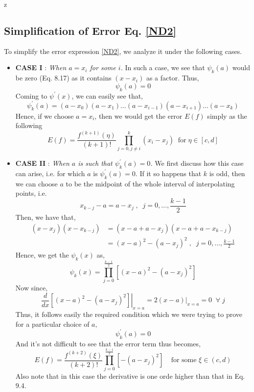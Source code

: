 z\documentclass[a4paper,12pt,twoside]{book}
\newcommand{\nll}[0]{\newline\newline}
\newcommand{\tit}[1]{\textit{#1}}
\newcommand{\der}[2]{\frac{d #1}{d #2}}
\begin{document}
\subsection{Simplification of Error Eq. \ref{ND2}}
To simplify the error expression \ref{ND2}, we analyze it under the following cases.
\begin{itemize}
    \item {\textbf{CASE I} : \tit{When $a=x_i$ for some $i$.}
    \nll
    In such a case, we see that $\psi_k(a)$ would be zero (Eq. 8.17) as it contains $(x-x_i)$ as a factor. Thus,
    \[\psi_k(a) = 0\]
    Coming to $\psi^\prime(x)$, we can easily see that,
    \[\psi_k^\prime(a) = (a-x_0)(a-x_1)\dots(a-x_{i-1})(a-x_{i+1})\dots(a-x_k)\]
    Hence, if we choose $a=x_i$, then we would get the error $E(f)$ simply as the following 
    \begin{equation}
        E(f) = \frac{f^{(k+1)}(\eta)}{(k+1)!} \prod_{j=0,j\neq i}^k (x_i-x_j) \;\;\text{for}\; \eta \in [c,d]
    \end{equation}
    }
    \item{\textbf{CASE II} : \tit{When $a$ is such that $\psi_k^\prime(a) = 0$.}
    \nll
    We first discuss how this case can arise, i.e. for which $a$ is $\psi^\prime_k(a) = 0$.
    \nll
    If it so happens that $k$ is odd, then we can choose $a$ to be the midpoint of the whole interval of interpolating points, i.e.
    \[x_{k-j} - a = a- x_j\;,\;\;j=0,\dots,\frac{k-1}{2}\]
    Then, we have that,
    \begin{equation*}
        \begin{split}
            (x-x_j)(x-x_{k-j}) &= (x-a+a-x_j)(x-a+a-x_{k-j})\\
            &= (x-a)^2 - (a-x_j)^2\;,\;\;j=0,\dots,\frac{k-1}{2}
        \end{split}
    \end{equation*}
    Hence, we get the $\psi_k(x)$ as,
    \[\psi_k(x) = \prod_{j=0}^{\frac{k-1}{2}} \left[ (x-a)^2 - (a-x_j)^2\right]\]
    Now since,
    \[\der{}{x} \left.\left[ (x-a)^2 - (a-x_j)^2\right]\right\vert_{x=a} = \left.2(x-a)\right\vert_{x=a} = 0 \;\;\forall\;j\]
    Thus, it follows easily the required condition which we were trying to prove for a particular choice of $a$,
    \[\psi_k^\prime(a) = 0\]
    And it's not difficult to see that the error term thus becomes,
    \begin{equation}
        E(f) = \frac{f^{(k+2)}(\xi)}{(k+2)!} \prod_{j=0}^{\frac{k-1}{2}} \left[ -(a-x_j)^2 \right]\;\;\;\;\text{for some }\xi \in (c,d)
    \end{equation}
    Also note that in this case the derivative is one orde higher than that in Eq. 9.4.
    }
\end{itemize}
\end{document}
